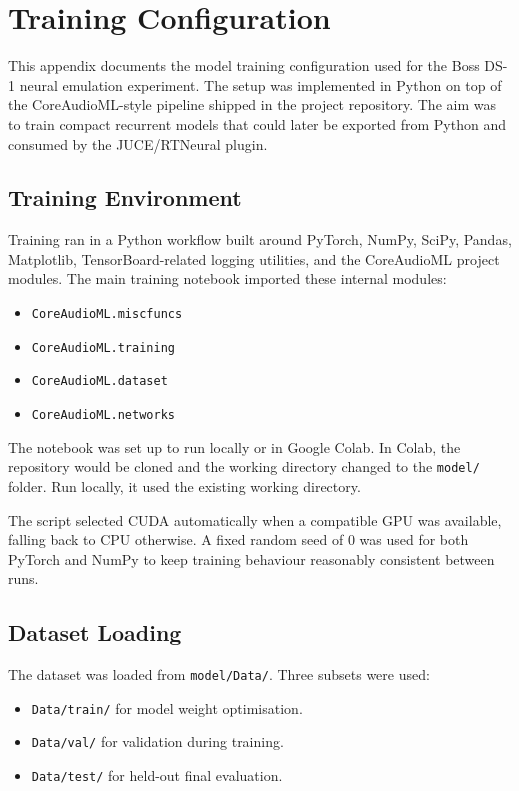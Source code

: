 \chapter{Training Configuration}
\label{appendix:training-configuration}

This appendix documents the model training configuration used for the Boss DS-1 neural emulation experiment. The setup was implemented in Python on top of the CoreAudioML-style pipeline shipped in the project repository. The aim was to train compact recurrent models that could later be exported from Python and consumed by the JUCE/RTNeural plugin.

\section{Training Environment}

Training ran in a Python workflow built around PyTorch, NumPy, SciPy, Pandas, Matplotlib, TensorBoard-related logging utilities, and the CoreAudioML project modules. The main training notebook imported these internal modules:

\begin{itemize}
  \item \texttt{CoreAudioML.miscfuncs}
  \item \texttt{CoreAudioML.training}
  \item \texttt{CoreAudioML.dataset}
  \item \texttt{CoreAudioML.networks}
\end{itemize}

The notebook was set up to run locally or in Google Colab. In Colab, the repository would be cloned and the working directory changed to the \texttt{model/} folder. Run locally, it used the existing working directory.

The script selected CUDA automatically when a compatible GPU was available, falling back to CPU otherwise. A fixed random seed of 0 was used for both PyTorch and NumPy to keep training behaviour reasonably consistent between runs.

\section{Dataset Loading}

The dataset was loaded from \texttt{model/Data/}. Three subsets were used:

\begin{itemize}
  \item \texttt{Data/train/} for model weight optimisation.
  \item \texttt{Data/val/} for validation during training.
  \item \texttt{Data/test/} for held-out final evaluation.
\end{itemize}

